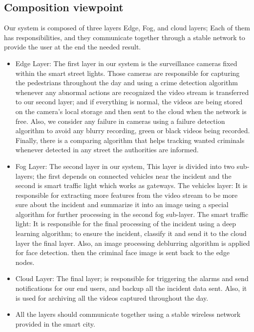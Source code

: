 \documentclass[12pt]{article}
\begin{document}
\subsection{Composition viewpoint}\label{ss-comp}

Our system is composed of three layers Edge, Fog, and cloud layers; Each of them has responsibilities, and they communicate together through a stable network to provide the user at the end the needed result.
\begin{itemize}
\item Edge Layer: The first layer in our system is the surveillance cameras fixed within the smart street lights. Those cameras are responsible for capturing the pedestrians throughout the day and using a crime detection algorithm whenever any abnormal actions are recognized the video stream is transferred to our second layer; and if everything is normal, the videos are being stored on the camera's local storage and then sent to the cloud when the network is free. Also, we consider any failure in cameras using a failure detection algorithm to avoid any blurry recording, green or black videos being recorded. Finally, there is a comparing algorithm that helps tracking wanted criminals whenever detected in any street the authorities are informed.
\item Fog Layer: The second layer in our system, This layer is divided into two sub-layers; the first depends on connected vehicles near the incident and the second is smart traffic light which works as gateways.
\subitem The vehicles layer: It is responsible for extracting more features from the video stream to be more sure about the incident and summarize it into an image using a special algorithm for further processing in the second fog sub-layer.
\subitem The smart traffic light: It is responsible for the final processing of the incident using a deep learning algorithm; to ensure the incident, classify it and send it to the cloud layer the final layer. Also, an image processing deblurring algorithm is applied for face detection. then the criminal face image is sent back to the edge nodes.
\item Cloud Layer: The final layer; is responsible for triggering the alarms and send notifications for our end users, and backup all the incident data sent. Also, it is used for archiving all the videos captured throughout the day.
\item All the layers should communicate together using a stable wireless network provided in the smart city.
\end{itemize} 
\end{document}
